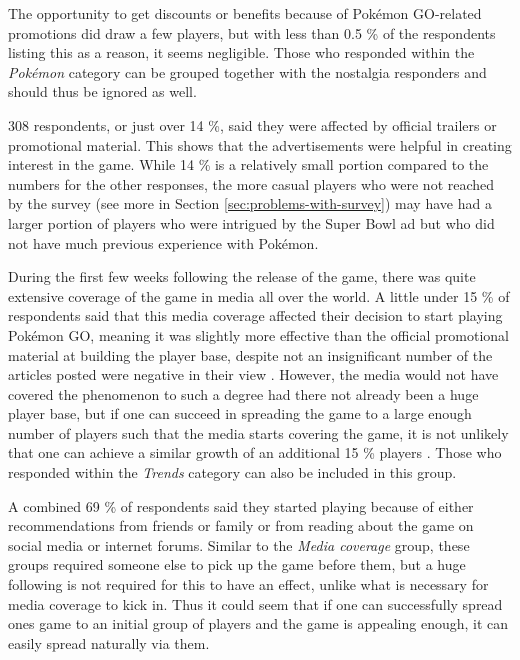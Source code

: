 The opportunity to get discounts or benefits because of Pokémon GO-related promotions did draw a few players, but with less than 0.5 \% of the respondents listing this as a reason, it seems negligible. Those who responded within the \emph{Pokémon} category can be grouped together with the nostalgia responders and should thus be ignored as well.

308 respondents, or just over 14 \%, said they were affected by official trailers or promotional material. This shows that the advertisements  were helpful in creating interest in the game. While 14 \% is a relatively small portion compared to the numbers for the other responses, the more casual players who were not reached by the survey (see more in Section \ref{sec:problems-with-survey}) may have had a larger portion of players who were intrigued by the Super Bowl ad but who did not have much previous experience with Pokémon. 

During the first few weeks following the release of the game, there was quite extensive coverage of the game in media all over the world. A little under 15 \% of respondents said that this media coverage affected their decision to start playing Pokémon GO, meaning it was slightly more effective than the official promotional material at building the player base, despite not an insignificant number of the articles posted were negative in their view . However, the media would not have covered the phenomenon to such a degree had there not already been a huge player base, but if one can succeed in spreading the game to a large enough number of players such that the media starts covering the game, it is not unlikely that one can achieve a similar growth of an additional 15 \% players . Those who responded within the \emph{Trends} category can also be included in this group.

A combined 69 \% of respondents said they started playing because of either recommendations from friends or family or from reading about the game on social media or internet forums. Similar to the \emph{Media coverage} group, these groups required someone else to pick up the game before them, but a huge following is not required for this to have an effect, unlike what is necessary for media coverage to kick in. Thus it could seem that if one can successfully spread ones game to an initial group of players and the game is appealing enough, it can easily spread naturally via them.

